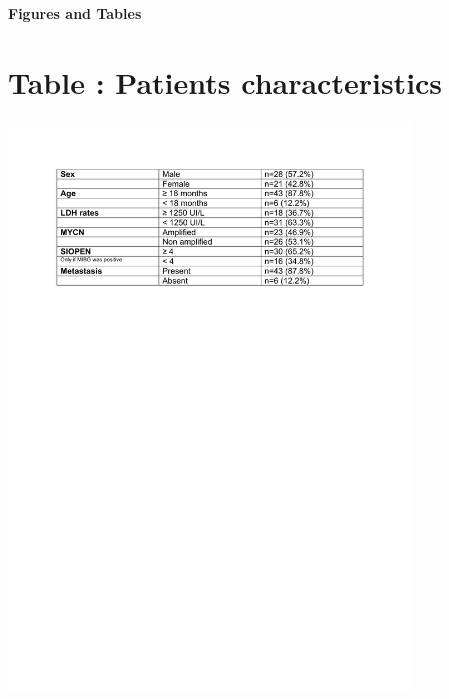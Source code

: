 \documentclass[11pt]{article}
\newcounter{tabnb} %
\begin{document}
\renewcommand\thesection{}
\renewcommand\thesubsection{}
\renewcommand\thesubsubsection{}
\selectfont
{}
\graphicspath{
{/Users/benzekry/work/marseille/neuroblastome_andre/code/}
{figures_files/}
}
\setlength{\parindent}{0mm}
\textbf{\Huge{Figures and Tables}}

\renewcommand{\cfttoctitlefont}{\normalfont\MakeUppercase}
\renewcommand{\contentsname}{}
\tableofcontents

\vskip2cm
\newpage
\vskip2cm
\renewcommand\thesection{}
\def\spaceV{\vskip0.5cm}
\newpage
{}
\section{Table : Patients characteristics}
\spaceV
\begin{center}
\includegraphics[width=0.8\textwidth]{table_1.pdf}
\end{center}
\end{document}
